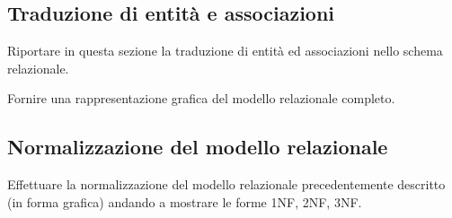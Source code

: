 \subsection*{Traduzione di entità e associazioni}

\begin{templateblock}
    Riportare in questa sezione la traduzione di entità ed associazioni
    nello schema relazionale.

    Fornire una rappresentazione grafica del modello relazionale completo.
\end{templateblock}

\subsection*{Normalizzazione del modello relazionale}

\begin{templateblock}
    Effettuare la normalizzazione del modello relazionale precedentemente
    descritto (in forma grafica) andando a mostrare le forme 1NF, 2NF, 3NF.
\end{templateblock}
